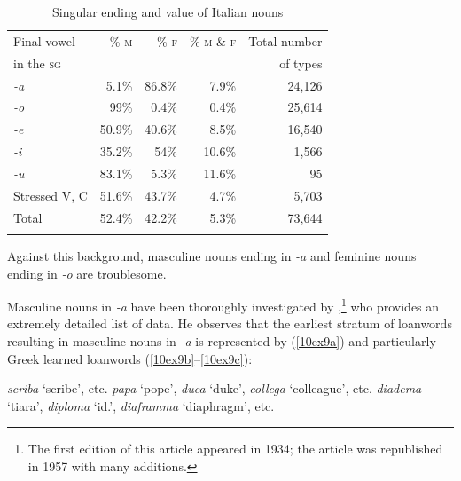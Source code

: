 \documentclass[output=paper,colorlinks,citecolor=brown]{langscibook}
\begin{document}
\begin{table}[ht]
	\centering
	\begin{tabularx}{0.75\textwidth}{lrrrr}
		\lsptoprule
			Final vowel & \% \textsc{m} & \% \textsc{f} & \% \textsc{m} \& \textsc{f} & Total number \\
			in the \textsc{sg} & & & & of types \\
			\midrule
			\emph{-a} & 5.1\% &  86.8\% & 7.9\% & 24,126 \\
			\emph{-o} & 99\% & 0.4\% & 0.4\% & 25,614 \\
			\emph{-e} & 50.9\% & 40.6\% & 8.5\% & 16,540 \\
			\emph{-i} & 35.2\% & 54\% & 10.6\% & 1,566 \\
			\emph{-u} & 83.1\% & 5.3\% & 11.6\% & 95 \\
			Stressed V, C & 51.6\% & 43.7\% & 4.7\% & 5,703 \\
			Total & 52.4\% & 42.2\% & 5.3\% & 73,644 \\
		\lspbottomrule
	\end{tabularx}
	\caption{Singular ending and  value of Italian nouns}
	\label{10tab12}
\end{table}

Against this background, masculine nouns ending in \emph{-a} and feminine nouns ending in \emph{-o} are troublesome.

 \label{10sec3.2.3.2}

Masculine nouns in \emph{-a} have been thoroughly investigated by \citet{migliorini1957},\footnote{The first edition of this article appeared in 1934; the article was republished in 1957 with many additions.} who provides an extremely detailed list of data. He observes that the earliest stratum of loanwords resulting in masculine nouns in \emph{-a} is represented by  (\ref{10ex9a}) and particularly Greek learned loanwords (\ref{10ex9b}--\ref{10ex9c}):

\begin{exe}
	\ex \label{10ex9}
	\begin{xlist}
		\ex \label{10ex9a} \emph{scriba} ‘scribe’, etc.
		\ex \label{10ex9b} \emph{papa} ‘pope’, \emph{duca} ‘duke’, \emph{collega} ‘colleague’, etc.
		\ex \label{10ex9c} \emph{diadema} ‘tiara’, \emph{diploma} ‘id.’, \emph{diaframma} ‘diaphragm’, etc.
	\end{xlist}
\end{exe}
\end{document}
